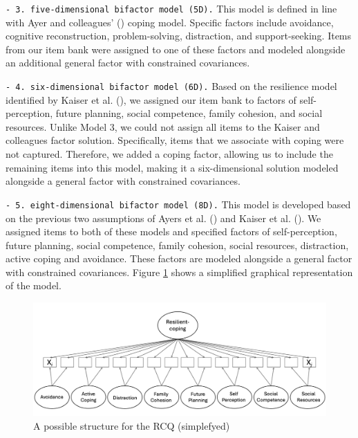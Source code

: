 \documentclass[
  man,floatsintext]{apa7}
\begin{document}
\texttt{-\ 3.\ five-dimensional\ bifactor\ model\ (5D).} This model is defined in line with Ayer and colleagues' () coping model. Specific factors include avoidance, cognitive reconstruction, problem-solving, distraction, and support-seeking. Items from our item bank were assigned to one of these factors and modeled alongside an additional general factor with constrained covariances.

\texttt{-\ 4.\ six-dimensional\ bifactor\ model\ (6D).} Based on the resilience model identified by Kaiser et al. (), we assigned our item bank to factors of self-perception, future planning, social competence, family cohesion, and social resources. Unlike Model 3, we could not assign all items to the Kaiser and colleagues factor solution. Specifically, items that we associate with coping were not captured. Therefore, we added a coping factor, allowing us to include the remaining items into this model, making it a six-dimensional solution modeled alongside a general factor with constrained covariances.

\texttt{-\ 5.\ eight-dimensional\ bifactor\ model\ (8D).} This model is developed based on the previous two assumptions of Ayers et al. () and Kaiser et al. (). We assigned items to both of these models and specified factors of self-perception, future planning, social competence, family cohesion, social resources, distraction, active coping and avoidance. These factors are modeled alongside a general factor with constrained covariances. Figure \ref{fig:myfig} shows a simplified graphical representation of the model. \footnotesize

\begin{figure}[H]

{\centering \caption[A possible structure for the RCQ (simplefyed)]{A possible structure for the RCQ (simplefyed)}\label{fig:myfig}
\includegraphics[width=1\linewidth]{sem/sem4_saved_backup} 

}

\end{figure}
\end{document}
